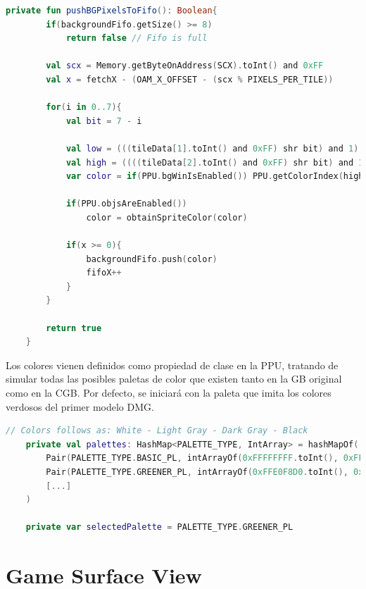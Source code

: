 \begin{lstlisting}[language=Kotlin, caption={FIFO Fetcher - Push de Píxeles al FIFO.}, label={code:ppufifopushpixels}]
    private fun pushBGPixelsToFifo(): Boolean{
        if(backgroundFifo.getSize() >= 8)
            return false // Fifo is full

        val scx = Memory.getByteOnAddress(SCX).toInt() and 0xFF
        val x = fetchX - (OAM_X_OFFSET - (scx % PIXELS_PER_TILE))

        for(i in 0..7){
            val bit = 7 - i

            val low = (((tileData[1].toInt() and 0xFF) shr bit) and 1)
            val high = ((((tileData[2].toInt() and 0xFF) shr bit) and 1) shl 1)
            var color = if(PPU.bgWinIsEnabled()) PPU.getColorIndex(high or low) else PPU.getColorIndex(0) // Pixel Color

            if(PPU.objsAreEnabled())
                color = obtainSpriteColor(color)

            if(x >= 0){
                backgroundFifo.push(color)
                fifoX++
            }
        }

        return true
    }
\end{lstlisting}

Los colores vienen definidos como propiedad de clase en la PPU, tratando de simular todas las posibles paletas de color que existen tanto en la GB original como en la CGB. Por defecto, se iniciará con la paleta que imita los colores verdosos del primer modelo DMG.

\begin{lstlisting}[language=Kotlin, caption={PPU - Paletas de Color.}, label={code:ppucolorpalettes}]
    // Colors follows as: White - Light Gray - Dark Gray - Black
    private val palettes: HashMap<PALETTE_TYPE, IntArray> = hashMapOf(
        Pair(PALETTE_TYPE.BASIC_PL, intArrayOf(0xFFFFFFFF.toInt(), 0xFFAAAAAA.toInt(), 0xFF555555.toInt(), 0xFF000000.toInt())),
        Pair(PALETTE_TYPE.GREENER_PL, intArrayOf(0xFFE0F8D0.toInt(), 0xFF88C070.toInt(), 0xFF346856.toInt(), 0xFF081820.toInt())),
        [...]
    )

    private var selectedPalette = PALETTE_TYPE.GREENER_PL
\end{lstlisting}

\section{Game Surface View}

